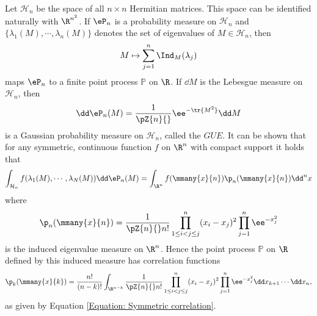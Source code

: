 \begin{exemplo}
	Let $\mathcal{H}_n$ be the space of all $n\times n$ Hermitian matrices. This space can be identified naturally with $\R^{n^2}$. If $\eP_n$ is a probability measure on $\mathcal{H}_n$ and $\{\lambda_1(M), \cdots, \lambda_n(M) \}$ denotes the set of eigenvalues of $M \in \mathcal{H}_n$, then
	\begin{equation}
		M \mapsto \sum_{j=1}^{n} \Ind_{M}{(\lambda_j)}
	\end{equation}
	maps $\eP_n$ to a finite point process $\mathbb{P}$ on $\R$. If $\dd M$ is the Lebesgue measure on $\mathcal{H}_n$, then
	\begin{equation}
		\dd \eP_n(M) = \frac{1}{\pZ{n}{}} \ee^{-\tr{M^2}} \dd M
	\end{equation}
	is a Gaussian probability measure on $\mathcal{H}_n$, called the $GUE$. It can be shown that for any symmetric, continuous function $f$ on $\R^n$ with compact support it holds that
	\begin{equation}
		\int_{\mathcal{H}_n} f(\lambda_1(M), \cdots, \lambda_N(M)) \dd \eP_n(M) = \int_{\R^n} f(\mmany{x}{n}) \p_n(\mmany{x}{n}) \dd^n x 
	\end{equation}
	where
	\begin{equation}
		\p_n(\mmany{x}{n}) = \frac{1}{\pZ{n}{} n!} \prod_{1 \leq i < j \leq j}^n (x_i - x_j)^2 \prod_{j=1}^{n} \ee^{-x^2_j}
	\end{equation}
	is the induced eigenvalue measure on $\R^n$. Hence the point process $\mathbb{P}$ on $\R$ defined by this induced measure has correlation functions
	\begin{equation}
		\p_k(\mmany{x}{k}) = \frac{n!}{(n-k)!} \int_{\R^{n-k}} \frac{1}{\pZ{n}{} n!} \prod_{1 \leq i < j \leq j}^n (x_i - x_j)^2 \prod_{j=1}^{n} \ee^{-x^2_j} \dd x_{k+1} \cdots \dd x_n,
	\end{equation}
	as given by Equation \ref{Equation: Symmetric correlation}.
\end{exemplo}


